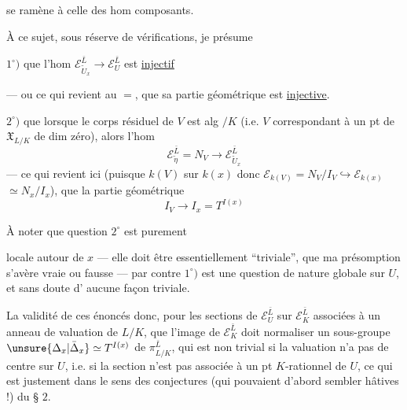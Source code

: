 
se ramène à celle des hom composants.

À ce sujet, sous réserve de vérifications, je présume

$1^\circ)$ que l'hom $\mathcal E_{\tilde U_x}^{\bar L}\longrightarrow\mathcal E_U^{\bar L}$ est \uline{injectif}

--- ou ce qui revient au $=$, que sa partie géométrique
est \uline{injective}.


$2^\circ)$ que  lorsque le corps résiduel de $V$ est alg $/K$ (i.e. $V$ correspondant à un pt de $\mathfrak X_{L/K}$ de dim zéro), alors l'hom
\[
 \mathcal E_{\tilde\eta}^{\bar L}=N_V\longrightarrow\mathcal E_{\tilde U_x}^{\bar L}
\]
    --- ce qui revient ici (puisque $k(V)$   sur $k(x)$ donc $\mathcal E_{k(V)}=N_V/I_V\hookrightarrow\mathcal E_{k(x)}$  $\simeq N_x/I_x$), que la partie géométrique
\[
 I_V\longrightarrow I_x=T^{I(x)}
\]
    

À noter que  question $2^\circ$ est purement

locale autour de $x$ --- elle doit être essentiellement ``triviale'', que ma présomption s'avère vraie ou fausse --- par contre $1^\circ)$ est une question de nature globale sur $U$, et sans doute d' aucune façon triviale.

 La validité de ces énoncés   donc, pour les sections de $\mathcal E_U^{\bar L}$ sur $\mathcal E_K^{\bar L}$ associées à un anneau de valuation de $L/K$,  que l'image de $\mathcal E_K^{\bar L}$ doit normaliser un  sous-groupe $\unsure{\Delta_x|\bar\Delta_x}\simeq T^{I(x)}$ de $\pi_{L/K}^{\bar L}$, qui est non trivial si la valuation n'a pas de centre sur $U$, i.e. si la section n'est pas associée à un pt $K$-rationnel de $U$, ce qui est justement dans le sens des conjectures (qui pouvaient d'abord sembler hâtives !) du § $2$.

